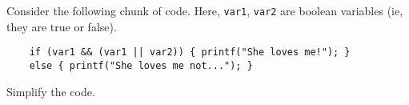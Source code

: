 Consider the following chunk of code. Here, \verb|var1|, \verb|var2| are boolean variables (ie, they are true or false).
\begin{verbatim}
    if (var1 && (var1 || var2)) { printf("She loves me!"); }
    else { printf("She loves me not..."); }
\end{verbatim}
Simplify the code.

